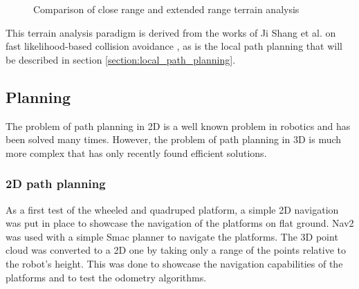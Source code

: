\documentclass[11pt]{article}
\begin{document}
        \begin{figure}[H]
            \centering
            \caption{Comparison of close range and extended range terrain analysis}
        \end{figure}

        This terrain analysis paradigm is derived from the works of Ji Shang et al. on fast likelihood-based collision avoidance \cite{zhang2020falco}, as is the local path planning that will be described in section \ref{section:local_path_planning}.
        

    \subsection{Planning}
        The problem of path planning in 2D is a well known problem in robotics and has been solved many times. However, the problem of path planning in 3D is much more complex that has only recently found efficient solutions. 

        \subsubsection{2D path planning}
        As a first test of the wheeled and quadruped platform, a simple 2D navigation was put in place to showcase the navigation of the platforms on flat ground. Nav2 \cite{macenski2020marathon2} was used with a simple Smac planner \cite{macenski2024smac} to navigate the platforms. The 3D point cloud was converted to a 2D one by taking only a range of the points relative to the robot's height. This was done to showcase the navigation capabilities of the platforms and to test the odometry algorithms.
\end{document}
